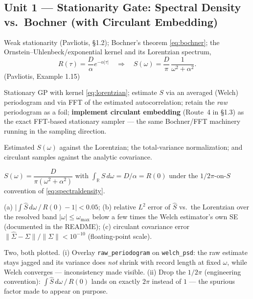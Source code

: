 \documentclass[11pt]{article}
\newcommand{\pav}[1]{{\small\color{hubblue}(Pavliotis, #1)}}
\newenvironment{unitmeta}{%
  \begin{description}[style=sameline,leftmargin=1.4cm,font=\bfseries\color{hubblue}]
}{%
  \end{description}
}
\begin{document}
\subsection*{Unit 1 --- Stationarity Gate: Spectral Density vs.\ Bochner (with Circulant Embedding)}
\begin{unitmeta}
\item[Concept] Weak stationarity \pav{\S1.2}; Bochner's theorem \eqref{eq:bochner}; the Ornstein--Uhlenbeck\slash exponential kernel and its Lorentzian spectrum,
\begin{equation}
R(\tau) = \frac{D}{\alpha}e^{-\alpha|\tau|} \quad\Longrightarrow\quad S(\omega) = \frac{D}{\pi}\,\frac{1}{\omega^2+\alpha^2}.
\label{eq:lorentzian}
\end{equation}
\pav{Example 1.15}
\item[Build] Stationary GP with kernel \eqref{eq:lorentzian}; estimate $S$ via an averaged (Welch) periodogram and via FFT of the estimated autocorrelation; retain the \emph{raw} periodogram as a foil; \textbf{implement circulant embedding} (Route~4 in \S1.3) as the exact FFT-based stationary sampler --- the same Bochner/FFT machinery running in the sampling direction.
\item[Check] Estimated $S(\omega)$ against the Lorentzian; the total-variance normalization; and circulant samples against the analytic covariance.
\item[Analytic target] $S(\omega)=\dfrac{D}{\pi(\omega^2+\alpha^2)}$ with $\displaystyle\int_{\mathbb{R}}S\,d\omega = D/\alpha = R(0)$ under the $1/2\pi$-on-$S$ convention of \eqref{eq:spectraldensity}.
\item[Pass/fail] (a) $\big|\int\widehat S\,d\omega\,/\,R(0) - 1\big| < 0.05$; (b) relative $L^2$ error of $\widehat S$ vs.\ the Lorentzian over the resolved band $|\omega|\le\omega_{\max}$ below a few times the Welch estimator's own SE (documented in the README); (c) circulant covariance error $\|\widehat\Sigma-\Sigma\|/\|\Sigma\| < 10^{-10}$ (floating-point scale).
\item[Negative control] Two, both plotted. (i) Overlay \texttt{raw\_periodogram} on \texttt{welch\_psd}: the raw estimate stays jagged and its variance does \emph{not} shrink with record length at fixed $\omega$, while Welch converges --- inconsistency made visible. (ii) Drop the $1/2\pi$ (engineering convention): $\int\widehat S\,d\omega\,/\,R(0)$ lands on exactly $2\pi$ instead of $1$ --- the spurious factor made to appear on purpose.

\end{unitmeta}
\end{document}
